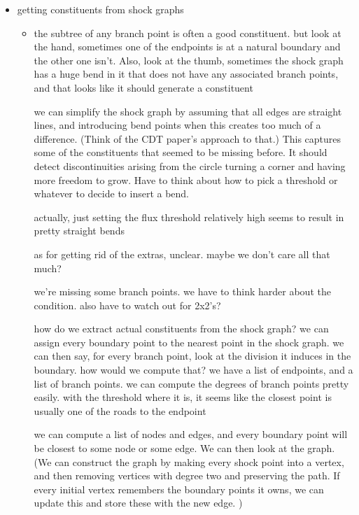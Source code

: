\documentclass{book}
\begin{document}
\begin{itemize}
\item getting constituents from shock graphs

\begin{itemize}
\item the subtree of any branch point is often a good
      constituent. but look at the hand, sometimes one of the
      endpoints is at a natural boundary and the other one
      isn't. Also, look at the thumb, sometimes the shock graph has a
      huge bend in it that does not have any associated branch points,
      and that looks like it should generate a constituent

      we can simplify the shock graph by assuming that all edges are
      straight lines, and introducing bend points when this creates
      too much of a difference. (Think of the CDT paper's approach to
      that.) This captures some of the constituents that seemed to be
      missing before. It should detect discontinuities arising from
      the circle turning a corner and having more freedom to
      grow. Have to think about how to pick a threshold or whatever to
      decide to insert a bend.

      actually, just setting the flux threshold relatively high seems
      to result in pretty straight bends

      as for getting rid of the extras, unclear. maybe we don't care
      all that much?

      we're missing some branch points. we have to think harder about
      the condition. also have to watch out for 2x2's?

      how do we extract actual constituents from the shock graph? we
      can assign every boundary point to the nearest point in the
      shock graph. we can then say, for every branch point, look at
      the division it induces in the boundary. how would we compute
      that? we have a list of endpoints, and a list of branch
      points. we can compute the degrees of branch points pretty
      easily. with the threshold where it is, it seems like the
      closest point is usually one of the roads to the endpoint

      we can compute a list of nodes and edges, and every boundary
      point will be closest to some node or some edge. We can then
      look at the graph. (We can construct the graph by making every
      shock point into a vertex, and then removing vertices with
      degree two and preserving the path. If every initial vertex
      remembers the boundary points it owns, we can update this and
      store these with the new edge. )


\end{itemize}
\end{itemize}
\end{document}
